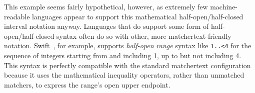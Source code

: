 This example seems fairly hypothetical, however,
as extremely few machine-readable languages
appear to support this mathematical
half-open/half-closed interval notation anyway.
Languages that do support some form of half-open/half-closed syntax
often do so with other, more matchertext-friendly notation.
Swift~\cite{apple22swift}, for example,
supports \emph{half-open range} syntax like \verb|1..<4|
for the sequence of integers starting from and including 1,
up to but not including 4.
This syntax is perfectly compatible with the standard matchertext configuration
because it uses the mathematical inequality operators,
rather than unmatched matchers,
to express the range's open upper endpoint.

